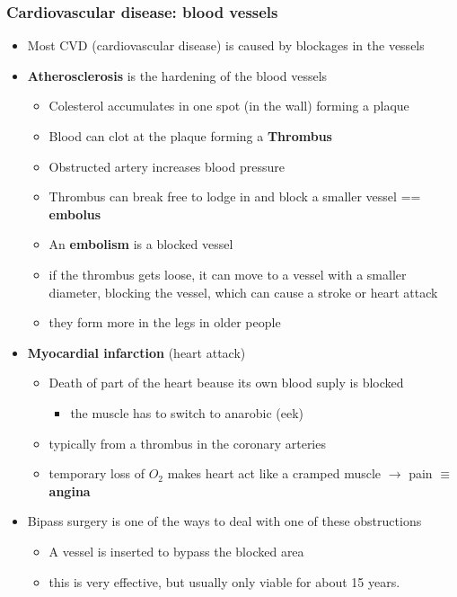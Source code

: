 \documentclass{article}
\theoremstyle{definition}
\begin{document}
\subsubsection{Cardiovascular disease: blood vessels}
\begin{itemize}
	\item Most CVD (cardiovascular disease) is caused by blockages in the vessels
	\item \textbf{Atherosclerosis} is the hardening of the blood vessels
		\begin{itemize}
			\item Colesterol accumulates in one spot (in the wall) forming a plaque
			\item Blood can clot at the plaque forming a \textbf{Thrombus} 
			\item Obstructed artery increases blood pressure
			\item Thrombus can break free to lodge in and block a smaller vessel == \textbf{embolus} 
			\item An \textbf{embolism} is a blocked vessel
			\item if the thrombus gets loose, it can move to a vessel with a smaller diameter, blocking the vessel, which can cause a stroke or heart attack
			\item they form more in the legs in older people
		\end{itemize}
	\item \textbf{Myocardial infarction}  (heart attack)
		\begin{itemize}
			\item Death of part of the heart beause its own blood suply is blocked
				\begin{itemize}
					\item the muscle has to switch to anarobic (eek)
				\end{itemize}
			\item typically from a thrombus in the coronary arteries
			\item temporary loss of $O_2$ makes heart act like a cramped muscle $\to$ pain $\equiv$ \textbf{angina} 
		\end{itemize}
	\item Bipass surgery is one of the ways to deal with one of these obstructions
		\begin{itemize}
			\item A vessel is inserted to bypass the blocked area
			\item this is very effective, but usually only viable for about 15 years.

\end{itemize}
\end{itemize}
\end{document}
